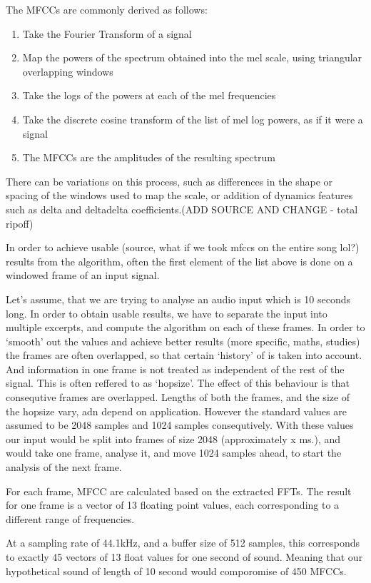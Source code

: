 The MFCCs are commonly derived as follows:

\begin{enumerate}
\item{Take the Fourier Transform of a signal}
\item{Map the powers of the spectrum obtained into the mel scale,
    using triangular overlapping windows}
\item{Take the logs of the powers at each of the mel frequencies}
\item{Take the discrete cosine transform of the list of mel log
    powers, as if it were a signal}
  \item{The MFCCs are the amplitudes of the resulting spectrum}
\end{enumerate}

There can be variations on this process, such as differences in the
shape or spacing of the windows used to map the scale, or addition of
dynamics features such as delta and deltadelta coefficients.(ADD
SOURCE AND CHANGE - total ripoff)

In order to achieve  usable (source, what if we took mfccs on the
entire song lol?) results from the algorithm, often the first element
of the list above is done on a windowed frame of an input signal.

Let's assume, that we are trying to analyse an audio input which is 10
seconds long. In order to obtain usable results, we have to separate
the input into multiple excerpts, and compute the algorithm on each of
these frames. In order to `smooth' out the values and achieve better
results (more specific, maths, studies) the frames are often
overlapped, so that certain `history' of is taken into account. And
information in one frame is not treated as independent of the rest of
the signal. This is often reffered to as `hopsize'. The effect of this
behaviour is that consequtive frames are overlapped. Lengths of both
the frames, and the size of the hopsize vary, adn depend on
application. However the standard values are assumed to be 2048
samples and 1024 samples consequtively. With these values our input
would be split into frames of size 2048 (approximately x ms.), and
would take one frame, analyse it, and move 1024 samples ahead, to
start the analysis of the next frame.

For each frame, MFCC are calculated based on the extracted
FFTs. The result for one frame is a vector of 13 floating point
values, each corresponding to a different range of frequencies.

At a sampling rate of 44.1kHz, and a buffer size of 512 samples, this
corresponds to exactly 45 vectors of 13 float values for one second of
sound. Meaning that our hypothetical sound of length of 10 second
would comporomise of 450 MFCCs.

